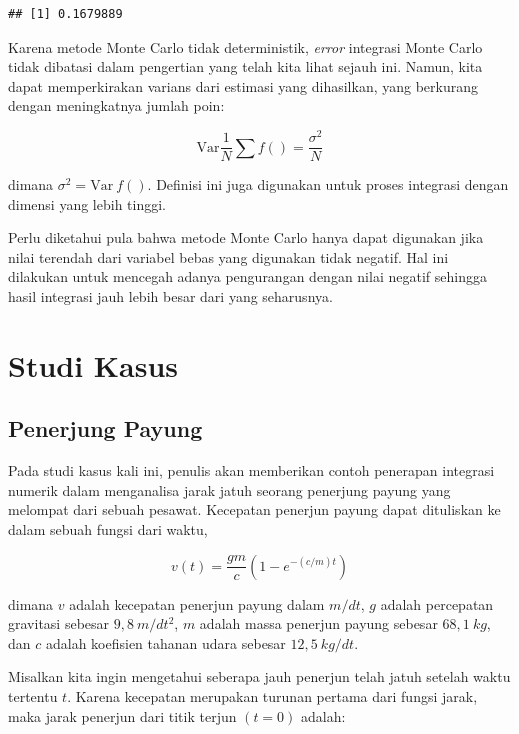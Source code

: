 \documentclass[]{book}
\theoremstyle{definition}
\theoremstyle{definition}
\theoremstyle{definition}
\theoremstyle{remark}
\begin{document}
\begin{verbatim}
## [1] 0.1679889
\end{verbatim}

Karena metode Monte Carlo tidak deterministik, \emph{error} integrasi Monte Carlo tidak dibatasi dalam pengertian yang telah kita lihat sejauh ini. Namun, kita dapat memperkirakan varians dari estimasi yang dihasilkan, yang berkurang dengan meningkatnya jumlah poin:

\begin{equation}
\text{Var}\frac{1}{N}\sum f\left(\right)=\frac{\sigma^2}{N}
  \label{eq:monte3}
\end{equation}

dimana \(\sigma^2=\text{Var}\ f\left(\right)\). Definisi ini juga digunakan untuk proses integrasi dengan dimensi yang lebih tinggi.

Perlu diketahui pula bahwa metode Monte Carlo hanya dapat digunakan jika nilai terendah dari variabel bebas yang digunakan tidak negatif. Hal ini dilakukan untuk mencegah adanya pengurangan dengan nilai negatif sehingga hasil integrasi jauh lebih besar dari yang seharusnya.

\hypertarget{studi-kasus-2}{%
\section{Studi Kasus}\label{studi-kasus-2}}

\hypertarget{penerjung-payung}{%
\subsection{Penerjung Payung}\label{penerjung-payung}}

Pada studi kasus kali ini, penulis akan memberikan contoh penerapan integrasi numerik dalam menganalisa jarak jatuh seorang penerjung payung yang melompat dari sebuah pesawat. Kecepatan penerjun payung dapat dituliskan ke dalam sebuah fungsi dari waktu,

\begin{equation}
v\left(t\right)=\frac{gm}{c}\left(1-e^{-\left(c/m\right)t}\right)
  \label{eq:terjun}
\end{equation}

dimana \(v\) adalah kecepatan penerjun payung dalam \(m/dt\), \(g\) adalah percepatan gravitasi sebesar \(9,8 \ m/dt^2\), \(m\) adalah massa penerjun payung sebesar \(68,1 \ kg\), dan \(c\) adalah koefisien tahanan udara sebesar \(12,5\ kg/dt\).

Misalkan kita ingin mengetahui seberapa jauh penerjun telah jatuh setelah waktu tertentu \(t\). Karena kecepatan merupakan turunan pertama dari fungsi jarak, maka jarak penerjun dari titik terjun \(\left(t=0\right)\) adalah:
\end{document}
